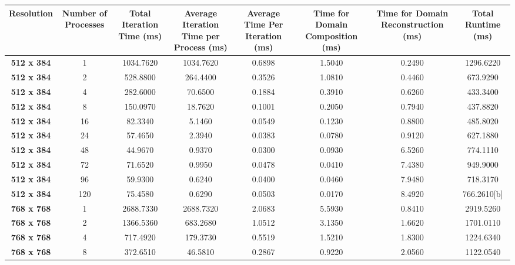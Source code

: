 \documentclass[11pt, a4paper]{article}
\begin{document}
		\begin{table}
			\centering
			    \begin{tabular}{|c|c|c|c|c|c|c|c|}
					\hline
					\multicolumn{1}{|p{7.5em}|}{\textbf{Resolution}} & \multicolumn{1}{p{7.5em}|}{\textbf{Number of Processes}} & \multicolumn{1}{p{7.5em}|}{\textbf{Total Iteration Time (ms)}} & \multicolumn{1}{p{7.5em}|}{\textbf{Average Iteration Time per Process (ms)}} & \multicolumn{1}{p{7.5em}|}{\textbf{Average Time Per Iteration (ms)}} & \multicolumn{1}{p{7.5em}|}{\textbf{Time for Domain Composition (ms)}} & \multicolumn{1}{p{7.5em}|}{\textbf{Time for Domain Reconstruction (ms)}} & \multicolumn{1}{p{7.5em}|}{\textbf{Total Runtime (ms)}} \\
					\hline
					\textbf{512 x 384} & 1     & 1034.7620 & 1034.7620 & 0.6898 & 1.5040 & 0.2490 & 1296.6220 \\
					\textbf{512 x 384} & 2     & 528.8800 & 264.4400 & 0.3526 & 1.0810 & 0.4460 & 673.9290 \\
					\textbf{512 x 384} & 4     & 282.6000 & 70.6500 & 0.1884 & 0.3910 & 0.6260 & 433.3400 \\
					\textbf{512 x 384} & 8     & 150.0970 & 18.7620 & 0.1001 & 0.2050 & 0.7940 & 437.8820 \\
					\textbf{512 x 384} & 16    & 82.3340 & 5.1460 & 0.0549 & 0.1230 & 0.8800 & 485.8020 \\
					\textbf{512 x 384} & 24    & 57.4650 & 2.3940 & 0.0383 & 0.0780 & 0.9120 & 627.1880 \\
					\textbf{512 x 384} & 48    & 44.9670 & 0.9370 & 0.0300 & 0.0930 & 6.5260 & 774.1110 \\
					\textbf{512 x 384} & 72    & 71.6520 & 0.9950 & 0.0478 & 0.0410 & 7.4380 & 949.9000 \\
					\textbf{512 x 384} & 96    & 59.9300 & 0.6240 & 0.0400 & 0.0460 & 7.9480 & 718.3170 \\
					\textbf{512 x 384} & 120   & 75.4580 & 0.6290 & 0.0503 & 0.0170 & 8.4920 & 766.2610[b]\\
					\hline
					\textbf{768 x 768} & 1     & 2688.7330 & 2688.7320 & 2.0683 & 5.5930 & 0.8410 & 2919.5260 \\
					\textbf{768 x 768} & 2     & 1366.5360 & 683.2680 & 1.0512 & 3.1350 & 1.6620 & 1701.0110 \\
					\textbf{768 x 768} & 4     & 717.4920 & 179.3730 & 0.5519 & 1.5210 & 1.8300 & 1224.6340 \\
					\textbf{768 x 768} & 8     & 372.6510 & 46.5810 & 0.2867 & 0.9220 & 2.0560 & 1122.0540 \\

\end{tabular}
\end{table}
\end{document}
